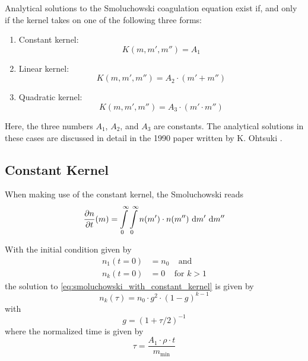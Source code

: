     Analytical solutions to the Smoluchowski coagulation equation exist if, and only if the kernel
    takes on one of the following three forms:
    \begin{enumerate}
        \item Constant kernel:
            \begin{equation}
                K(m, m', m'') = A_1
            \end{equation}
        \item Linear kernel:
            \begin{equation}
                K(m, m', m'') = A_2 \cdot (m' + m'')
            \end{equation}
        \item Quadratic kernel:
            \begin{equation}
                K(m, m', m'') = A_3 \cdot (m' \cdot m'')
            \end{equation}
    \end{enumerate}

    Here, the three numbers $A_1$, $A_2$, and $A_3$ are constants. 
    The analytical solutions in these cases are discussed in detail 
    in the 1990 paper written by K. Ohtsuki \cite{ohtsuki_1990}.

    \subsection{Constant Kernel}


    When making use of the constant kernel, the Smoluchowski reads
    \begin{equation}
        \frac{\partial n}{\partial t}(m)
            = 
                \int\limits_0^\infty \int\limits_0^\infty
                n(m') \cdot n(m'')
                \ \text{d} m' \ \text{d} m''
        \label{eq:smoluchowski_with_constant_kernel}
    \end{equation}
    
    With the initial condition given by 
    \begin{align}
        n_1(t=0) &= n_0 
        \ \ \ \ \ \text{and} \\
        n_k(t=0) &= 0 
        \ \ \ \ \ \text{for } k>1
    \end{align}
    the solution to \cref{eq:smoluchowski_with_constant_kernel} is 
    given by \cite{smoluchowski_1916} \cite{ohtsuki_2017}
    \begin{equation}
        n_k(\tau) = n_0 \cdot g^2 \cdot (1-g)^{k-1}
    \end{equation}
    with 
    \begin{equation}
        g = (1+\tau/2)^{-1}
    \end{equation}
    where the normalized time is given by 
    \begin{equation}
        \tau = \frac{A_1 \cdot \rho \cdot t}{m_\text{min}}
    \end{equation}

